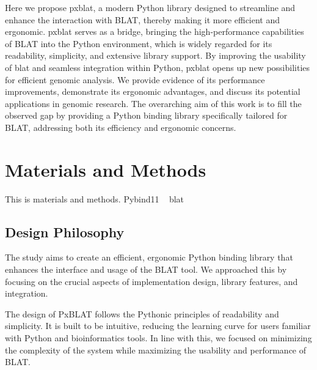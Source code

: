 Here we propose \acrshort{pxblat}, a modern Python library designed to streamline and enhance the interaction with BLAT, thereby making it more efficient and ergonomic.
\acrshort{pxblat} serves as a bridge, bringing the high-performance capabilities of BLAT into the Python environment, which is widely regarded for its readability, simplicity, and extensive library support.
By improving the usability of \acrshort{blat}  and seamless integration within Python, \acrshort{pxblat} opens up new possibilities for efficient genomic analysis.
We provide evidence of its performance improvements, demonstrate its ergonomic advantages, and discuss its potential applications in genomic research.
The overarching aim of this work is to fill the observed gap by providing a Python binding library specifically tailored for BLAT, addressing both its efficiency and ergonomic concerns.

\section*{Materials and Methods}\label{sec:materials-and-methods}

This is materials and methods.
Pybind11 ~\citep{pybind11}
blat ~\citep{kent2002blat}

\subsection*{Design Philosophy}\label{ssec:design-philosophy}



The study aims to create an efficient, ergonomic Python binding library that enhances the interface and usage of the BLAT tool.
We approached this by focusing on the crucial aspects of implementation design, library features, and integration.


The design of PxBLAT follows the Pythonic principles of readability and simplicity.
It is built to be intuitive, reducing the learning curve for users familiar with Python and bioinformatics tools.
In line with this, we focused on minimizing the complexity of the system while maximizing the usability and performance of BLAT.

